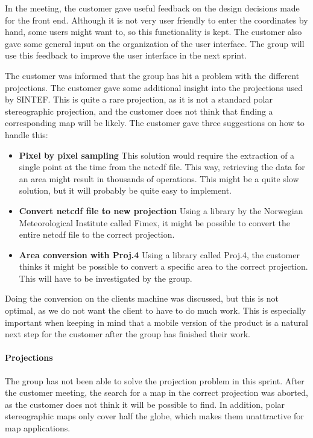 \documentclass[11pt,a4paper,titlepage,oneside]{report}
\begin{document}
In the meeting, the customer gave useful feedback on the design decisions made for the front end. Although it is not very user friendly to enter the coordinates by hand, some users might want to, so this functionality is kept. The customer also gave some general input on the organization of the user interface. The group will use this feedback to improve the user interface in the next sprint. 

The customer was informed that the group has hit a problem with the different projections. The customer gave some additional insight into the projections used by SINTEF. This is quite a rare projection, as it is not a standard polar stereographic projection, and the customer does not think that finding a corresponding map will be likely. The customer gave three suggestions on how to handle this:
\begin{itemize}
\item \textbf{Pixel by pixel sampling} This solution would require the extraction of a single point at the time from the \gls{netcdf} file. This way, retrieving the data for an area might result in thousands of operations. This might be a quite slow solution, but it will probably be quite easy to implement.
\item \textbf{Convert \gls{netcdf} file to new projection} Using a library by the Norwegian Meteorological Institute called \gls{Fimex}, it might be possible to convert the entire \gls{netcdf} file to the correct projection. 
\item \textbf{Area conversion with Proj.4} Using a library called Proj.4, the customer thinks it might be possible to convert a specific area to the correct projection. This will have to be investigated by the group.
\end{itemize}

Doing the conversion on the clients machine was discussed, but this is not optimal, as we do not want the client to have to do much work. This is especially important when keeping in mind that a mobile version of the product is a natural next step for the customer after the group has finished their work.

\paragraph{Projections}
The group has not been able to solve the projection problem in this sprint. After the customer meeting, the search for a map in the correct projection was aborted, as the customer does not think it will be possible to find. In addition, polar stereographic maps only cover half the globe, which makes them unattractive for map applications. 
\end{document}
